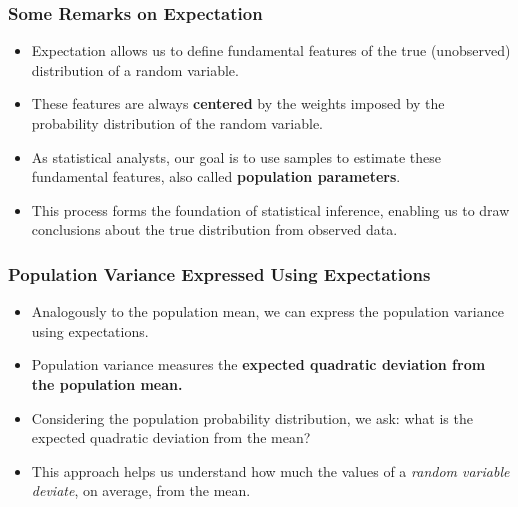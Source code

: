 \documentclass[handout]{beamer} %
\begin{document}
\begin{frame} %
\frametitle{Some Remarks on Expectation}

\begin{itemize}
  \item Expectation allows us to define fundamental features of the true (unobserved) distribution of a random variable.
  \pause
  \item These features are always \textbf{centered} by the weights imposed by the probability distribution of the random variable.
  \pause
  \item As statistical analysts, our goal is to use samples to estimate these fundamental features, also called \textbf{population parameters}.
  \pause
  \item This process forms the foundation of statistical inference, enabling us to draw conclusions about the true distribution from observed data.
\end{itemize}

\end{frame}

\begin{frame} %
\frametitle{Population Variance Expressed Using Expectations}

\begin{itemize}
  \item Analogously to the population mean, we can express the population variance using expectations.
  \pause
  \item Population variance measures the \textbf{expected quadratic deviation from the population mean.}
  \pause
  \item Considering the population probability distribution, we ask: what is the expected quadratic deviation from the mean?
  \pause
  \item This approach helps us understand how much the values of a \emph{random variable deviate}, on average, from the mean.
\end{itemize}

\end{frame}
\end{document}
